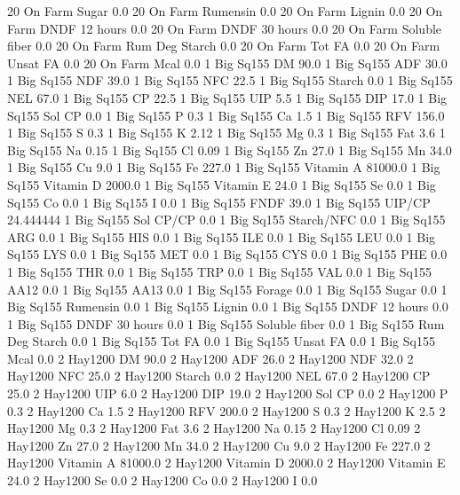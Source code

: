 \documentclass[letterpaper,10pt,english]{sphinxmanual}
\begin{document}
\begin{sphinxVerbatim}[commandchars=\\\{\},numbers=left,firstnumber=1,stepnumber=1]
20 On Farm Sugar \PYGZpc{} 0.0
20 On Farm Rumensin 0.0
20 On Farm Lignin 0.0
20 On Farm DNDF 12 hours 0.0
20 On Farm DNDF 30 hours 0.0
20 On Farm Soluble fiber 0.0
20 On Farm Rum Deg Starch 0.0
20 On Farm Tot FA 0.0
20 On Farm Unsat FA 0.0
20 On Farm Mcal 0.0
1 Big Sq155 DM 90.0
1 Big Sq155 ADF 30.0
1 Big Sq155 NDF 39.0
1 Big Sq155 NFC 22.5
1 Big Sq155 Starch 0.0
1 Big Sq155 NEL 67.0
1 Big Sq155 CP 22.5
1 Big Sq155 UIP 5.5
1 Big Sq155 DIP 17.0
1 Big Sq155 Sol CP 0.0
1 Big Sq155 P 0.3
1 Big Sq155 Ca 1.5
1 Big Sq155 RFV 156.0
1 Big Sq155 S 0.3
1 Big Sq155 K 2.12
1 Big Sq155 Mg 0.3
1 Big Sq155 Fat 3.6
1 Big Sq155 Na 0.15
1 Big Sq155 Cl 0.09
1 Big Sq155 Zn 27.0
1 Big Sq155 Mn 34.0
1 Big Sq155 Cu 9.0
1 Big Sq155 Fe 227.0
1 Big Sq155 Vitamin A 81000.0
1 Big Sq155 Vitamin D 2000.0
1 Big Sq155 Vitamin E 24.0
1 Big Sq155 Se 0.0
1 Big Sq155 Co 0.0
1 Big Sq155 I 0.0
1 Big Sq155 FNDF 39.0
1 Big Sq155 UIP/CP 24.444444
1 Big Sq155 Sol CP/CP 0.0
1 Big Sq155 Starch/NFC 0.0
1 Big Sq155 ARG 0.0
1 Big Sq155 HIS 0.0
1 Big Sq155 ILE 0.0
1 Big Sq155 LEU 0.0
1 Big Sq155 LYS 0.0
1 Big Sq155 MET 0.0
1 Big Sq155 CYS 0.0
1 Big Sq155 PHE 0.0
1 Big Sq155 THR 0.0
1 Big Sq155 TRP 0.0
1 Big Sq155 VAL 0.0
1 Big Sq155 AA\PYGZsh{}12 0.0
1 Big Sq155 AA\PYGZsh{}13 0.0
1 Big Sq155 \PYGZpc{} Forage 0.0
1 Big Sq155 Sugar \PYGZpc{} 0.0
1 Big Sq155 Rumensin 0.0
1 Big Sq155 Lignin 0.0
1 Big Sq155 DNDF 12 hours 0.0
1 Big Sq155 DNDF 30 hours 0.0
1 Big Sq155 Soluble fiber 0.0
1 Big Sq155 Rum Deg Starch 0.0
1 Big Sq155 Tot FA 0.0
1 Big Sq155 Unsat FA 0.0
1 Big Sq155 Mcal 0.0
2 Hay\PYGZsh{}1\PYGZhy{}200 DM 90.0
2 Hay\PYGZsh{}1\PYGZhy{}200 ADF 26.0
2 Hay\PYGZsh{}1\PYGZhy{}200 NDF 32.0
2 Hay\PYGZsh{}1\PYGZhy{}200 NFC 25.0
2 Hay\PYGZsh{}1\PYGZhy{}200 Starch 0.0
2 Hay\PYGZsh{}1\PYGZhy{}200 NEL 67.0
2 Hay\PYGZsh{}1\PYGZhy{}200 CP 25.0
2 Hay\PYGZsh{}1\PYGZhy{}200 UIP 6.0
2 Hay\PYGZsh{}1\PYGZhy{}200 DIP 19.0
2 Hay\PYGZsh{}1\PYGZhy{}200 Sol CP 0.0
2 Hay\PYGZsh{}1\PYGZhy{}200 P 0.3
2 Hay\PYGZsh{}1\PYGZhy{}200 Ca 1.5
2 Hay\PYGZsh{}1\PYGZhy{}200 RFV 200.0
2 Hay\PYGZsh{}1\PYGZhy{}200 S 0.3
2 Hay\PYGZsh{}1\PYGZhy{}200 K 2.5
2 Hay\PYGZsh{}1\PYGZhy{}200 Mg 0.3
2 Hay\PYGZsh{}1\PYGZhy{}200 Fat 3.6
2 Hay\PYGZsh{}1\PYGZhy{}200 Na 0.15
2 Hay\PYGZsh{}1\PYGZhy{}200 Cl 0.09
2 Hay\PYGZsh{}1\PYGZhy{}200 Zn 27.0
2 Hay\PYGZsh{}1\PYGZhy{}200 Mn 34.0
2 Hay\PYGZsh{}1\PYGZhy{}200 Cu 9.0
2 Hay\PYGZsh{}1\PYGZhy{}200 Fe 227.0
2 Hay\PYGZsh{}1\PYGZhy{}200 Vitamin A 81000.0
2 Hay\PYGZsh{}1\PYGZhy{}200 Vitamin D 2000.0
2 Hay\PYGZsh{}1\PYGZhy{}200 Vitamin E 24.0
2 Hay\PYGZsh{}1\PYGZhy{}200 Se 0.0
2 Hay\PYGZsh{}1\PYGZhy{}200 Co 0.0
2 Hay\PYGZsh{}1\PYGZhy{}200 I 0.0

\end{sphinxVerbatim}
\end{document}
